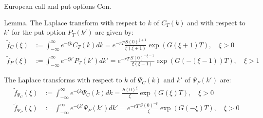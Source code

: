 \documentclass{beamer}
\begin{document}
\begin{frame}{European call and put options Con.}

    {\footnotesize \footnotesize
    \par Lemma. The Laplace transform with respect to \( k \) of \( C_T(k) \) and with respect to \( k' \) for 
    the put option \( P_T(k') \) are given by:
    \begin{align*}
        \tilde{f}_C(\xi) &:= \int_{-\infty}^{\infty} e^{-\xi k} C_T(k)  dk 
        = e^{-rT} \frac{S(0)^{\xi+1}}{\xi(\xi+1)} \exp(G(\xi+1)T), \quad \xi > 0\\
        \tilde{f}_P(\xi) &:= \int_{-\infty}^{\infty} e^{-\xi k'} P_T(k')  dk' 
        = e^{-rT} \frac{S(0)^{-\xi-1}}{\xi(\xi-1)} \exp(G(-(\xi-1))T), \quad \xi > 1
    \end{align*}
    \par  \pause The Laplace transforms with respect to \( k \)  of \( \Psi_C(k) \) and \( k' \) of \( \Psi_P(k') \) are:
    \begin{align*}
        \tilde{f}_{\Psi_C}(\xi) &:= \int_{-\infty}^{\infty} e^{-\xi k} \Psi_C(k)  dk = \frac{S(0)^{\xi}}{\xi} \exp(G(\xi)T), \quad \xi > 0\\
        \tilde{f}_{\Psi_P}(\xi) &:= \int_{-\infty}^{\infty} e^{-\xi k'} \Psi_P(k')  dk' = e^{-rT} \frac{S(0)^{-\xi}}{\xi} \exp(G(-\xi)T), \quad \xi > 0
    \end{align*}
    }
    
\end{frame}
\end{document}
